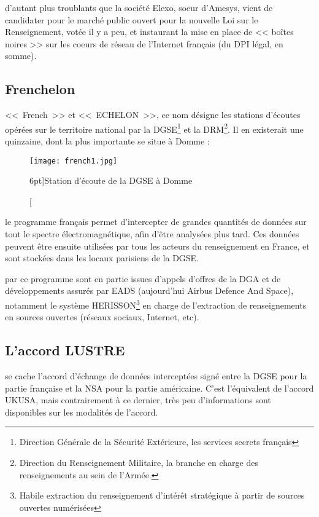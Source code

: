  d'autant plus troublants que la société Elexo, soeur
d'Amesys, vient de candidater\cite{elexo} pour le marché public ouvert pour la
nouvelle Loi sur le Renseignement, votée il y a peu, et instaurant la mise en place de <<
boîtes noires >> sur les coeurs de réseau de l'Internet français\cite{LR} (du
DPI légal, en somme).

\newpage
\subsection{Frenchelon}

 <<~French~>> et <<~ECHELON~>>, ce nom
désigne les stations d'écoutes opérées sur le territoire national par la
DGSE\footnote{Direction Générale de la Sécurité Extérieure, les services secrets
français} et la DRM\footnote{Direction du Renseignement Militaire, la branche
en charge des renseignements au sein de l'Armée.}. Il en existerait une
quinzaine, dont la plus importante se situe à Domme :

\vspace{0.7cm}
\begin{figure}
\texttt{[image: french1.jpg]}
\caption[Station d'écoute de Domme][6pt]{Station d'écoute de la DGSE
à Domme}
\label{fig:french1}
\end{figure}


 le programme français permet d'intercepter de
grandes quantités de données sur tout le spectre électromagnétique, afin d'être
analysées plus tard. Ces données peuvent être ensuite utilisées par tous les
acteurs du renseignement en France, et sont stockées dans les locaux parisiens
de la DGSE.\cite{bbf}

 par ce programme sont en partie issues
d'appels d'offres de la DGA et de développements assurés par EADS (aujourd'hui
Airbus Defence And Space), notamment le système HERISSON\footnote{Habile
extraction du renseignement d'intérêt stratégique à partir de sources ouvertes
numérisées}\cite{herisson} en charge de l'extraction de renseignements en
sources ouvertes (réseaux sociaux, Internet, etc).

\newpage
\subsection{L'accord LUSTRE}

 se cache l'accord d'échange de données
interceptées signé entre la DGSE pour la partie française et la NSA pour la
partie américaine. C'est l'équivalent de l'accord UKUSA, mais contrairement à ce
dernier, très peu d'informations sont disponibles sur les modalités de l'accord.

